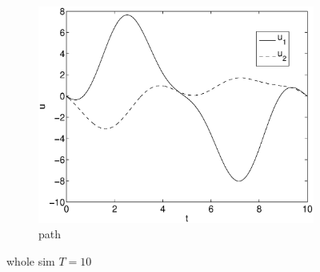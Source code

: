 \begin{figure}[h]
\begin{subfigure}[b]{\textwidth}
\centering
\includegraphics[height=0.3\textheight]{img/final_1_1_10_u.eps}
\caption{path}
\end{subfigure}
\caption{whole sim $T=10$}
\end{figure}

